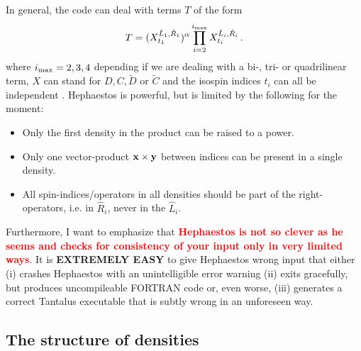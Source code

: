 \documentclass[print,amsmath,amssymb,aps,prc,nofootinbib,notitlepage]{revtex4-1}
\renewcommand{\vec}[1]{{\bf #1}}
\begin{document}
In general, the code can deal with terms $T$ of the form
%
\begin{align}
T = (X^{\hat{L}_1, \hat{R}_1}_{t_1})^{\alpha}  \prod_{i=2}^{i_{\rm max}} X^{\hat{L}_i, \hat{R}_i}_{t_i}  \, .
\end{align}
%
where $i_{\rm max} = 2,3,4$ depending if we are dealing with a 
bi-, tri- or quadrilinear term, $X$ can stand for $D, C, \tilde{D}$ or $\tilde{C}$ and
the isospin indices $t_i$ can all be independent . Hephaestos is powerful, 
but is limited by the following for the moment:
%
\begin{itemize}
\item Only the first density in the product can be raised to a power.
\item Only one vector-product $\vec{x} \times \vec{y}$ between indices 
      can be present in a single density.
\item All spin-indices/operators in all densities should be part of the 
      right-operators, i.e. in $\hat{R}_{i}$, never in the $\hat{L}_i$.
\end{itemize}
% 

Furthermore, I want to emphasize that 
\textbf{\textcolor{red}{Hephaestos is not so clever as he seems and checks
for consistency of your input only in very limited ways}}. It is \textbf{EXTREMELY
EASY} to give Hephaestos wrong input that either (i) crashes Hephaestos with 
an unintelligible error warning (ii) exits gracefully, but produces uncompileable
FORTRAN code or, even worse, (iii) generates a correct Tantalus executable that 
is subtly wrong in an unforeseen way. 

\subsection{The structure of densities}
\end{document}
